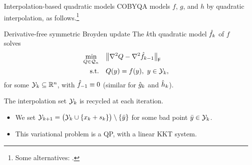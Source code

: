 \documentclass[
]{talk}
\newcommand*{\ceq}{h}
\newcommand*{\ceqm}[1][]{\hat{\ceq}\ifblank{#1}{}{_{#1}}}
\newcommand*{\cub}{g}
\newcommand*{\cubm}[1][]{\hat{\cub}\ifblank{#1}{}{_{#1}}}
\newcommand*{\iter}[1][]{x\ifblank{#1}{}{_{#1}}}
\newcommand*{\obj}{f}
\newcommand*{\objm}[1][]{\hat{\obj}\ifblank{#1}{}{_{#1}}}
\newcommand*{\step}[1][]{s\ifblank{#1}{}{_{#1}}}
\newcommand*{\xpt}[1][]{\mathcal{Y}\ifblank{#1}{}{_{#1}}}
\begin{document}
\begin{frame}{Interpolation-based quadratic models}
    COBYQA models $\obj$, $\cub$, and $\ceq$ by \alert{quadratic} interpolation, as follows.\footnote{Some alternatives: \textcite{Conn_Scheinberg_Toint_1997a,Conn_Scheinberg_Toint_1997b,Conn_Scheinberg_Toint_1998,Wild_2008,Bandeira_Scheinberg_Vicente_2012,Zhang_2014,Xie_Yuan_2023}.}

    \begin{exampleblock}{Derivative-free symmetric Broyden update \parencite{Powell_2004}}
        The $k$th quadratic model $\objm[k]$ of $\obj$ solves
        \begin{equation*}
            \begin{aligned}
                \min_{Q \in \mathcal{Q}_n}  & \quad \norm[\big]{\nabla^2 Q - \nabla^2 \objm[k - 1]}_{\mathsf{F}}\\
                \textrm{s.t.}               & \quad Q(y) = \obj(y), ~ y \in \xpt[k]\text{,}
            \end{aligned}
        \end{equation*}
        for some $\xpt[k] \subseteq \R^n$, with $\objm[-1] \equiv 0$ (similar for $\cubm[k]$ and $\ceqm[k]$).
    \end{exampleblock}

    \vspace{-0.5em}
    The interpolation set $\xpt[k]$ is \alert{recycled} at each iteration.
    \begin{itemize}
        \item We set $\xpt[k + 1] = \big(\xpt[k] \cup \set{\iter[k] + \step[k]}\big) \setminus \set{\bar{y}}$ for some bad point $\bar{y} \in \xpt[k]$.
        \item This variational problem is a QP, with a \alert{linear} KKT system.
    \end{itemize}
\end{frame}
\end{document}
